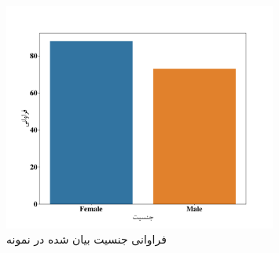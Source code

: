 \begin{figure}[htpb]
    \centering
    \includegraphics[width=0.8\textwidth]{./img/sexualityAgainstPopulation.pdf}
    \caption{فراوانی جنسیت بیان شده در نمونه}
    \label{fig:sexualityAgainstPopulation}
\end{figure}

